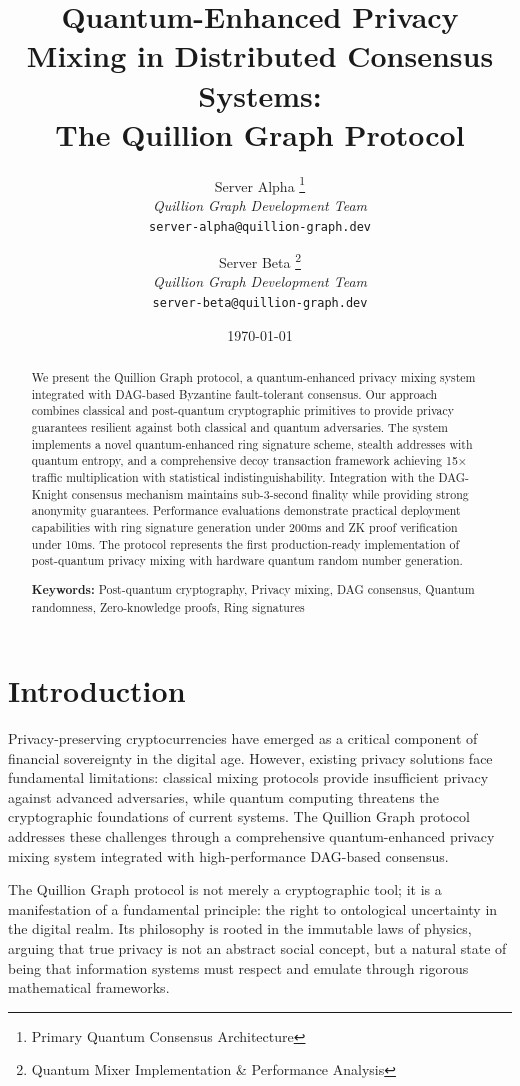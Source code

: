 \documentclass[12pt,a4paper]{article}
\title{\textbf{Quantum-Enhanced Privacy Mixing in Distributed Consensus Systems:\\
The Quillion Graph Protocol}}
\author{
Server Alpha \thanks{Primary Quantum Consensus Architecture}\\
\textit{Quillion Graph Development Team}\\
\texttt{server-alpha@quillion-graph.dev}
\and
Server Beta \thanks{Quantum Mixer Implementation \& Performance Analysis}\\
\textit{Quillion Graph Development Team}\\
\texttt{server-beta@quillion-graph.dev}
}
\date{\today}
\begin{document}
\maketitle

\begin{abstract}
We present the Quillion Graph protocol, a quantum-enhanced privacy mixing system integrated with DAG-based Byzantine fault-tolerant consensus. Our approach combines classical and post-quantum cryptographic primitives to provide privacy guarantees resilient against both classical and quantum adversaries. The system implements a novel quantum-enhanced ring signature scheme, stealth addresses with quantum entropy, and a comprehensive decoy transaction framework achieving 15× traffic multiplication with statistical indistinguishability. Integration with the DAG-Knight consensus mechanism maintains sub-3-second finality while providing strong anonymity guarantees. Performance evaluations demonstrate practical deployment capabilities with ring signature generation under 200ms and ZK proof verification under 10ms. The protocol represents the first production-ready implementation of post-quantum privacy mixing with hardware quantum random number generation.

\textbf{Keywords:} Post-quantum cryptography, Privacy mixing, DAG consensus, Quantum randomness, Zero-knowledge proofs, Ring signatures
\end{abstract}

\tableofcontents
\newpage

\section{Introduction}

Privacy-preserving cryptocurrencies have emerged as a critical component of financial sovereignty in the digital age. However, existing privacy solutions face fundamental limitations: classical mixing protocols provide insufficient privacy against advanced adversaries, while quantum computing threatens the cryptographic foundations of current systems. The Quillion Graph protocol addresses these challenges through a comprehensive quantum-enhanced privacy mixing system integrated with high-performance DAG-based consensus.

The Quillion Graph protocol is not merely a cryptographic tool; it is a manifestation of a fundamental principle: the right to ontological uncertainty in the digital realm. Its philosophy is rooted in the immutable laws of physics, arguing that true privacy is not an abstract social concept, but a natural state of being that information systems must respect and emulate through rigorous mathematical frameworks.
\end{document}
